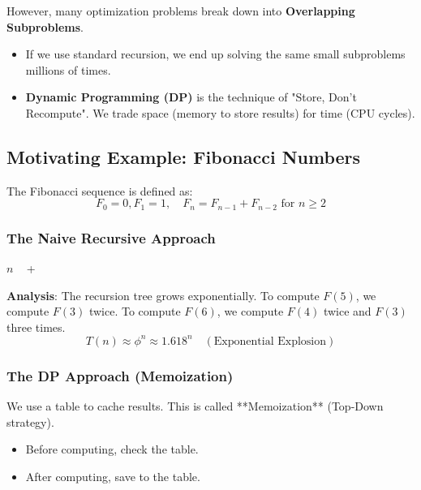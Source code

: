 \documentclass[12pt]{article}
\theoremstyle{blueplain}
\theoremstyle{bluedef}
\theoremstyle{blueremark}
\begin{document}
However, many optimization problems break down into \textbf{Overlapping Subproblems}.
\begin{itemize}
    \item If we use standard recursion, we end up solving the same small subproblems millions of times.
    \item \textbf{Dynamic Programming (DP)} is the technique of "Store, Don't Recompute". We trade space (memory to store results) for time (CPU cycles).
\end{itemize}

\subsection{Motivating Example: Fibonacci Numbers}

The Fibonacci sequence is defined as:
\[ F_0 = 0, F_1 = 1, \quad F_n = F_{n-1} + F_{n-2} \text{ for } n \ge 2 \]

\subsubsection{The Naive Recursive Approach}
\begin{algorithm}
    \caption{Naive-Fib(n)}
    \begin{algorithmic}[1]
         \Return $n$
        \Else \ \Return {} + 
        \EndIf
        \EndProcedure
    \end{algorithmic}
\end{algorithm}
\textbf{Analysis}:
The recursion tree grows exponentially. To compute $F(5)$, we compute $F(3)$ twice. To compute $F(6)$, we compute $F(4)$ twice and $F(3)$ three times.
\[ T(n) \approx \phi^n \approx 1.618^n \quad (\text{Exponential Explosion}) \]

\subsubsection{The DP Approach (Memoization)}
We use a table to cache results. This is called **Memoization** (Top-Down strategy).
\begin{itemize}
    \item Before computing, check the table.
    \item After computing, save to the table.
\end{itemize}
\end{document}
